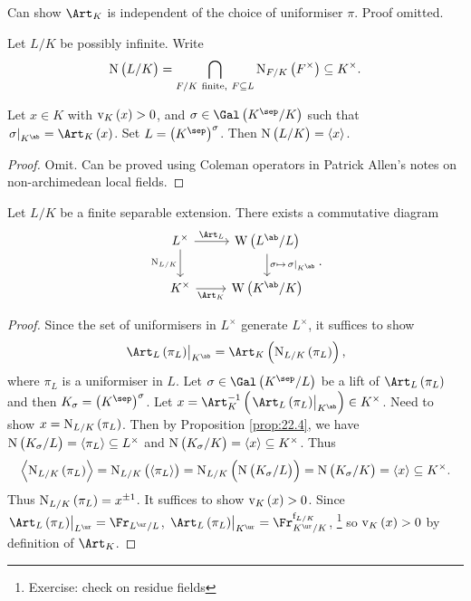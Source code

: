 \begin{remark*}
Can show $ \Art_K $ is independent of the choice of uniformiser $ \pi $. Proof omitted.
\end{remark*}

\begin{notation*}
Let $ L / K $ be possibly infinite. Write
$$ \N\br{L / K} = \bigcap_{F / K \ \text{finite}, \ F \subseteq L} \N_{F / K}\br{F^\times} \subseteq K^\times. $$
\end{notation*}

\begin{proposition}
\label{prop:22.4}
Let $ x \in K $ with $ \v_K\br{x} > 0 $, and $ \sigma \in \Gal\br{K^{\sep} / K} $ such that $ \eval{\sigma}_{K^{\ab}} = \Art_K\br{x} $. Set $ L = \br{K^{\sep}}^\sigma $. Then $ \N\br{L / K} = \abr{x} $.
\end{proposition}

\begin{proof}
Omit. Can be proved using Coleman operators in Patrick Allen's notes on non-archimedean local fields.
\end{proof}

\pagebreak

\begin{theorem}
\label{thm:22.5}
Let $ L / K $ be a finite separable extension. There exists a commutative diagram
$$
\begin{tikzcd}
L^\times \arrow{r}{\Art_L} \arrow{d}[swap]{\N_{L / K}} & \W\br{L^{\ab} / L} \arrow{d}{\sigma \mapsto \eval{\sigma}_{K^{\ab}}} \\
K^\times \arrow{r}[swap]{\Art_K} & \W\br{K^{\ab} / K}
\end{tikzcd}.
$$
\end{theorem}

\begin{proof}
Since the set of uniformisers in $ L^\times $ generate $ L^\times $, it suffices to show
$$ \eval{\Art_L\br{\pi_L}}_{K^{\ab}} = \Art_K\br{\N_{L / K}\br{\pi_L}}, $$
where $ \pi_L $ is a uniformiser in $ L $. Let $ \sigma \in \Gal\br{K^{\sep} / L} $ be a lift of $ \Art_L\br{\pi_L} $ and then $ K_\sigma = \br{K^{\sep}}^\sigma $. Let $ x = \Art_K^{-1}\br{\eval{\Art_L\br{\pi_L}}_{K^{\ab}}} \in K^\times $. Need to show $ x = \N_{L / K}\br{\pi_L} $. Then by Proposition \ref{prop:22.4}, we have $ \N\br{K_\sigma / L} = \abr{\pi_L} \subseteq L^\times $ and $ \N\br{K_\sigma / K} = \abr{x} \subseteq K^\times $. Thus
$$ \abr{\N_{L / K}\br{\pi_L}} = \N_{L / K}\br{\abr{\pi_L}} = \N_{L / K}\br{\N\br{K_\sigma / L}} = \N\br{K_\sigma / K} = \abr{x} \subseteq K^\times. $$
Thus $ \N_{L / K}\br{\pi_L} = x^{\pm 1} $. It suffices to show $ \v_K\br{x} > 0 $. Since $ \eval{\Art_L\br{\pi_L}}_{L^{\ur}} = \Fr_{L^{\ur} / L} $, $ \eval{\Art_L\br{\pi_L}}_{K^{\ur}} = \Fr_{K^{\ur} / K}^{\f_{L / K}} $, \footnote{Exercise: check on residue fields} so $ \v_K\br{x} > 0 $ by definition of $ \Art_K $.
\end{proof}

